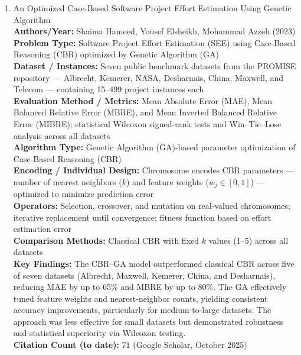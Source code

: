 \documentclass[a4paper,12pt]{article}
\begin{document}
\begin{enumerate}[leftmargin=2em, labelwidth=1em, labelsep=0.5em, itemsep=1ex]
  \item An Optimized Case-Based Software Project Effort Estimation Using Genetic Algorithm \\
    \textbf{Authors/Year:} Shaima Hameed, Yousef Elsheikh, Mohammad Azzeh (2023) \\  
    \textbf{Problem Type:} Software Project Effort Estimation (SEE) using Case-Based Reasoning (CBR) optimized by Genetic Algorithm (GA) \\  
    \textbf{Dataset / Instances:} Seven public benchmark datasets from the PROMISE repository — Albrecht, Kemerer, NASA, Desharnais, China, Maxwell, and Telecom — containing 15–499 project instances each \\  
    \textbf{Evaluation Method / Metrics:} Mean Absolute Error (MAE), Mean Balanced Relative Error (MBRE), and Mean Inverted Balanced Relative Error (MIBRE); statistical Wilcoxon signed-rank tests and Win–Tie–Lose analysis across all datasets \\  
    \textbf{Algorithm Type:} Genetic Algorithm (GA)-based parameter optimization of Case-Based Reasoning (CBR) \\  
    \textbf{Encoding / Individual Design:} Chromosome encodes CBR parameters — number of nearest neighbors ($k$) and feature weights ($w_j \in [0,1]$) — optimized to minimize prediction error \\  
    \textbf{Operators:} Selection, crossover, and mutation on real-valued chromosomes; iterative replacement until convergence; fitness function based on effort estimation error \\  
    \textbf{Comparison Methods:} Classical CBR with fixed $k$ values (1–5) across all datasets \\  
    \textbf{Key Findings:} The CBR–GA model outperformed classical CBR across five of seven datasets (Albrecht, Maxwell, Kemerer, China, and Desharnais), reducing MAE by up to 65\% and MBRE by up to 80\%. The GA effectively tuned feature weights and nearest-neighbor counts, yielding consistent accuracy improvements, particularly for medium-to-large datasets. The approach was less effective for small datasets but demonstrated robustness and statistical superiority via Wilcoxon testing. \\  
    \textbf{Citation Count (to date):} 71 (Google Scholar, October 2025) \\[2ex]
  

\end{enumerate}
\end{document}
